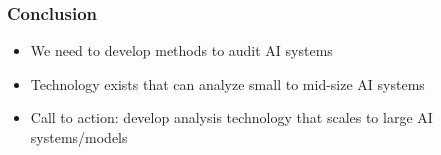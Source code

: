 \documentclass[aspectratio=169]{beamer}
\newcommand{\linegap}{\par\addvspace{3ex}}
\newcommand{\pausegap}{\pause\linegap}
\newcommand{\gemf}[1]{\textcolor{green!50!black}{#1}}
\begin{document}
\begin{frame}
  \frametitle{Conclusion}
  \begin{itemize}
  \item We need to develop methods to audit AI systems
    \linegap
  \item Technology exists that can analyze small to mid-size AI systems
    \linegap
  \item Call to action: develop analysis technology that scales to large AI systems/models
  \end{itemize}
\end{frame}



\end{document}
